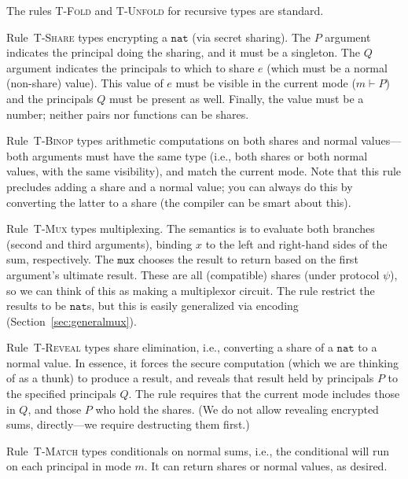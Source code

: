 \documentclass[10pt]{article}
\newcommand{\rulelab}[1]{{\small \textsc{#1}}}
\newcommand{\kw}[1]{\ensuremath{\mathtt{#1}}}
\newcommand{\tnat}{\ensuremath{\mathtt{nat}}}
\newcommand{\elet}[3]{\ensuremath{\kw{let}~#1\, =\, #2~\kw{in}\;{#3}}}
\newcommand{\epar}[2]{\ensuremath{\kw{par}~{#1}~{#2}}}
\begin{document}
The rules \rulelab{T-Fold} and \rulelab{T-Unfold} for recursive types
are standard.

Rule~\rulelab{T-Share} types encrypting a $\tnat$ (via secret
sharing). The $P$ argument indicates the principal doing the sharing,
and it must be a singleton. The $Q$ argument indicates the principals
to which to share $e$ (which must be a normal (non-share) value). This
value of $e$ must be visible in the current mode ($m \vdash P$) and
the principals $Q$ must be present as well. Finally, the value must be
a number; neither pairs nor functions can be shares.

Rule~\rulelab{T-Binop} types arithmetic computations on both shares
and normal values---both arguments must have the same type (i.e., both
shares or both normal values, with the same visibility), and match the
current mode. Note that this rule precludes adding a 
share and a normal value; you can always do this by converting the
latter to a share (the compiler can be smart about this).

Rule~\rulelab{T-Mux} types multiplexing. The semantics is to evaluate
both branches (second and third arguments), binding $x$ to the left
and right-hand sides of the sum, respectively. The $\kw{mux}$ chooses
the result to return based on the first argument's ultimate
result. These are all (compatible) shares (under protocol $\psi$), so
we can think of this as making a multiplexor circuit. The rule
restrict the results to be $\tnat$s, but this is easily generalized
via encoding (Section~\ref{sec:generalmux}).

Rule~\rulelab{T-Reveal} types share elimination, i.e., converting a
share of a $\tnat$ to a normal value. In essence, it forces the secure
computation (which we are thinking of as a thunk) to produce a result,
and reveals that result held by principals $P$ to the specified
principals $Q$. The rule requires that the current mode includes those
in $Q$, and those $P$ who hold the shares. (We do not allow revealing
encrypted sums, directly---we require destructing them first.)

Rule~\rulelab{T-Match} types conditionals on normal sums, i.e., the
conditional will run on each principal in mode $m$. It can return
shares or normal values, as desired. 

\end{document}
